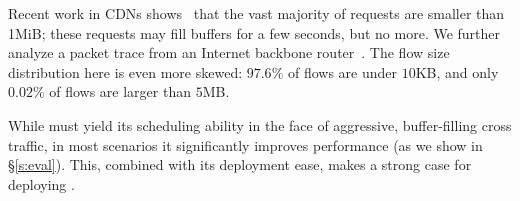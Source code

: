 Recent work in CDNs shows~\cite{akamai-cdn-trace} that the vast majority of requests are smaller than 1MiB; these requests may fill buffers for a few seconds, but no more.
We further analyze a packet trace from an Internet backbone router~\cite{caida-dataset}.
The flow size distribution here is even more skewed: $97.6\%$ of flows are under $10$KB, and only $0.02\%$ of flows are larger than $5$MB.

\vspace{0.05in}
 While \name must yield its scheduling ability in the face of aggressive, buffer-filling cross traffic, in most scenarios it significantly improves performance (as we show in \S\ref{s:eval}).
This, combined with its deployment ease, makes a strong case for deploying \name. 
